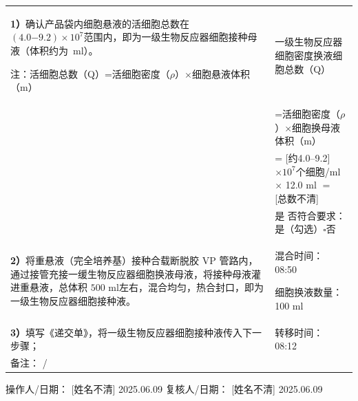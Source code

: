 \documentclass[UTF8,10pt,a4paper,fontset=fandol]{ctexart}
\newcommand{\fieldvalue}[1]{#1}
\newcommand{\handwritten}[1]{#1}
\begin{document}
\begin{tabularx}{\textwidth}{|p{}|X|}
\hline
\textbf{1）}确认产品袋内细胞悬液的活细胞总数在
$(4.0\mathord{-}9.2)\times10^{7}$范围内，即为一级生物反应器细胞接种母液（体积约为
\underline{\hspace{1cm}}\,ml）。

注：活细胞总数（Q）=活细胞密度（$\rho$）$\times$细胞悬液体积（m） &
一级生物反应器细胞密度换液细胞总数（Q）\\
& =活细胞密度（$\rho$）$\times$细胞换母液体积（m）\\
& =
\fieldvalue{\handwritten{[约4.0--9.2]$\times10^{7}$个细胞/ml}}
$\times$
\fieldvalue{\handwritten{12.0 ml}}
$=$
\fieldvalue{\handwritten{[总数不清]}} \\
& 是 否符合要求：\quad
\fieldvalue{\handwritten{是（勾选）}}\quad $\square$否
\\
\hline
\textbf{2）}将重悬液（完全培养基）接种合载断脱胶 VP 管路内，通过接管充接一缓生物反应器细胞换液母液，将接种母液灌进重悬液，总体积
$500$ ml左右，混合均匀，热合封口，即为一级生物反应器细胞接种液。 &
混合时间：
\fieldvalue{\handwritten{08:50}}

细胞换液数量：
\fieldvalue{\handwritten{100 ml}}
\\
\hline
\textbf{3）}填写《递交单》，将一级生物反应器细胞接种液传入下一步骤； &
转移时间：
\fieldvalue{\handwritten{08:12}}
\\
\hline
备注：
\fieldvalue{\handwritten{/}}
&
\\
\hline
\end{tabularx}

\vspace{3mm}

\noindent
操作人/日期：
\fieldvalue{\handwritten{[姓名不清]}}
\quad
\fieldvalue{\handwritten{2025.06.09}}
\hfill
复核人/日期：
\fieldvalue{\handwritten{[姓名不清]}}
\quad
\fieldvalue{\handwritten{2025.06.09}}
\end{document}
